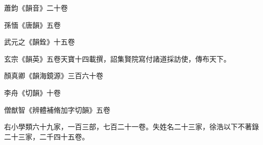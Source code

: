 \begin{pinyinscope}
 蕭鈞《韻音》二十卷



 孫愐《唐韻》五卷



 武元之《韻銓》十五卷



 玄宗《韻英》五卷天寶十四載撰，詔集賢院寫付諸道採訪使，傳布天下。



 顏真卿《韻海鏡源》三百六十卷



 李舟《切韻》十卷



 僧猷智《辨體補脩加字切韻》五卷



 右小學類六十九家，一百三部，七百二十一卷。失姓名二十三家，徐浩以下不著錄二十三家，二千四十五卷。



\end{pinyinscope}